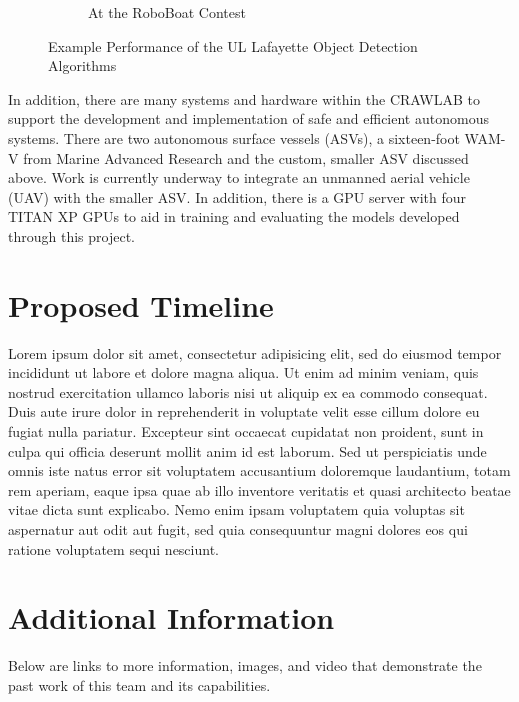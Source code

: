 \documentclass[12 pt]{article}
\begin{document}
\begin{figure}[tb]
\begin{subfigure}{0.48\columnwidth}
    \caption{At the RoboBoat Contest}
    \label{fig:RoboBoat_example}
    \end{subfigure}
\caption{Example Performance of the UL Lafayette Object Detection Algorithms} %
\label{fig:detection_examples}	%
\end{figure}
%

In addition, there are many systems and hardware within the CRAWLAB to support the development and implementation of safe and efficient autonomous systems. There are two autonomous surface vessels (ASVs), a sixteen-foot WAM-V from Marine Advanced Research and the custom, smaller ASV discussed above. Work is currently underway to integrate an unmanned aerial vehicle (UAV) with the smaller ASV. In addition, there is a GPU server with four TITAN XP GPUs to aid in training and evaluating the models developed through this project.


\section{Proposed Timeline}
\label{sec:timeline}
\vspace{-0.2in}
%
Lorem ipsum dolor sit amet, consectetur adipisicing elit, sed do eiusmod tempor incididunt ut labore et dolore magna aliqua. Ut enim ad minim veniam, quis nostrud exercitation ullamco laboris nisi ut aliquip ex ea commodo consequat. Duis aute irure dolor in reprehenderit in voluptate velit esse cillum dolore eu fugiat nulla pariatur. Excepteur sint occaecat cupidatat non proident, sunt in culpa qui officia deserunt mollit anim id est laborum. Sed ut perspiciatis unde omnis iste natus error sit voluptatem accusantium doloremque laudantium, totam rem aperiam, eaque ipsa quae ab illo inventore veritatis et quasi architecto beatae vitae dicta sunt explicabo. Nemo enim ipsam voluptatem quia voluptas sit aspernatur aut odit aut fugit, sed quia consequuntur magni dolores eos qui ratione voluptatem sequi nesciunt.  

\section{Additional Information}
\label{sec:additional}
\vspace{-0.2in}
%
Below are links to more information, images, and video that demonstrate the past work of this team and its capabilities. 
\end{document}
